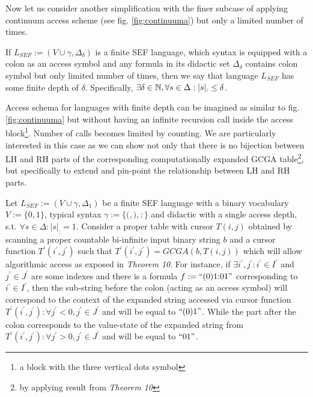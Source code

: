 Now let us consider another simplification with the finer subcase of applying continuum access scheme (see fig. \ref{fig:continuuma}) but only a limited number of times.

\begin{definition}If $L_{SEF} := (V \cup \gamma, \Delta_\delta)$ is a finite SEF language, which syntax is equipped with a colon as an access symbol and any formula in its didactic set $\Delta_\delta$ contains colon symbol but only limited number of times, then we say that language $L_{SEF}$ has some finite depth of $\delta$. Specifically, $\exists \delta \in \mathbb{N}, \forall s \in \Delta : |s|_{{:}} \leq \delta$.\end{definition}

Access schema for languages with finite depth can be imagined as similar to fig.\ref{fig:continuuma} but without having an infinite recursion call inside the access block\footnote{a block with the three vertical dots symbol}. Number of calls becomes limited by counting. We are particularly interested in this case as we can show not only that there is no bijection between LH and RH parts of the corresponding computationally expanded GCGA table\footnote{by applying result from \textit{Theorem 10}}, but specifically to extend and pin-point the relationship between LH and RH parts.

Let $L_{SEF} := (V \cup \gamma, \Delta_1)$ be a finite SEF language with a binary vocabulary $V := \{0,1\}$, typical syntax $\gamma := \{{(}, {)}, {:}\}$ and didactic with a single access depth, s.t. $\forall s \in \Delta : |s|_{{:}} = 1$. Consider a proper table with cursor $T(i,j)$ obtained by scanning a proper countable bi-infinite input binary string $b$ and a cursor function $T^\prime(i^\prime,j^\prime)$ such that $T^\prime(i^\prime,j^\prime) = GCGA(b, T(i,j))$ which will allow algorithmic access as exposed in \textit{Theorem 10}. For instance, if $\exists i^\prime,j^\prime: i^\prime \in I^\prime$ and $j^\prime \in J^\prime$ are some indexes and there is a formula $f := \text{``}(0)1{:}01\text{''}$ corresponding to $i^\prime \in I^\prime$, then the sub-string before the colon (acting as an access symbol) will correspond to the context of the expanded string accessed via cursor function $T^\prime(i^\prime,j^\prime): \forall j^\prime < 0, j^\prime \in J^\prime$ and will be equal to $\text{``}(0)1\text{''}$. While the part after the colon corresponds to the value-state of the expanded string from $T^\prime(i^\prime,j^\prime): \forall j^\prime > 0, j^\prime \in J^\prime$ and will be equal to $\text{``}01\text{''}$.

